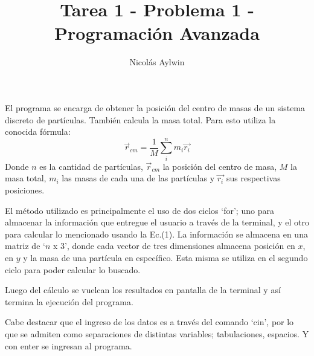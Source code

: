 \documentclass[12pt]{article}
\title{Tarea 1 - Problema 1 - Programación Avanzada}
\author{Nicolás Aylwin}
\date{}
\begin{document}
\maketitle
El programa se encarga de obtener la posición del centro de masas de un sistema discreto de partículas. También calcula la masa total. Para esto utiliza la conocida fórmula:
\begin{equation}
\vec{r}_{cm}=\frac{1}{M}\sum_{i}^{n}m_{i}\vec{r_i} 
\end{equation}
Donde $n$ es la cantidad de partículas, $\vec{r}_{cm}$ la posición del centro de masa, $M$ la masa total, $m_i$ las masas de cada una de las partículas y $\vec{r_i}$ sus respectivas posiciones.

El método utilizado es principalmente el uso de dos ciclos `for'; uno para almacenar la información que entregue el usuario a través de la terminal, y el otro para calcular lo mencionado usando la Ec.(1). La información se almacena en una matriz de `$n$ x $3$', donde cada vector de tres dimensiones almacena posición en $x$, en $y$ y la masa de una partícula en específico. Esta misma se utiliza en el segundo ciclo para poder calcular lo buscado.

Luego del cálculo se vuelcan los resultados en pantalla de la terminal y así termina la ejecución del programa.

Cabe destacar que el ingreso de los datos es a través del comando `cin', por lo que se admiten como separaciones de distintas variables; tabulaciones, espacios. Y con enter se ingresan al programa.
\end{document}
